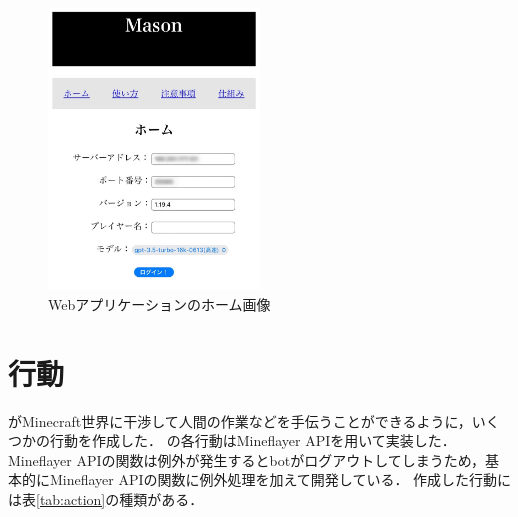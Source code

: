 \begin{figure}[H]
    \centering
    \includegraphics[width=0.5\textwidth]{fig/web_app.jpg}
    \caption{Webアプリケーションのホーム画像}
    \label{fig:web_app}
\end{figure}

\section{行動}\label{sec:act}
{\mason}がMinecraft世界に干渉して人間の作業などを手伝うことができるように，いくつかの行動を作成した．
{\mason}の各行動はMineflayer API\cite{bib:Mineflayer}を用いて実装した．
Mineflayer APIの関数は例外が発生するとbotがログアウトしてしまうため，基本的にMineflayer APIの関数に例外処理を加えて開発している．
作成した行動には表\ref{tab:action}の種類がある．

